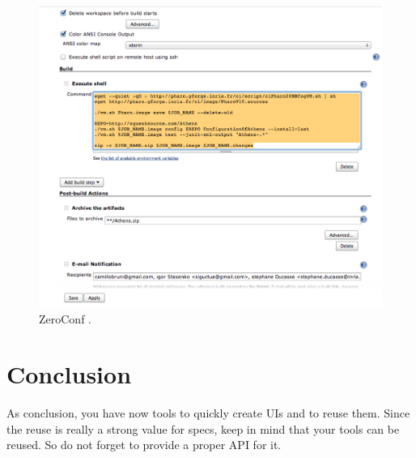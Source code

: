 \documentclass[a4paper,10pt,twoside]{book}
\begin{document}
\begin{figure}[!h]
	\centering
	\includegraphics[width=\textwidth]{Jenkins}
	\caption{ZeroConf \label{fig:jenkins}.}
\end{figure}


\section{Conclusion}
As conclusion, you have now tools to quickly create UIs and to reuse them. Since the reuse is really a strong value for specs, keep in mind that your tools can be reused. So do not forget to provide a proper API for it.

\ifx\wholebook\relax\else
   
   
\end{document}
